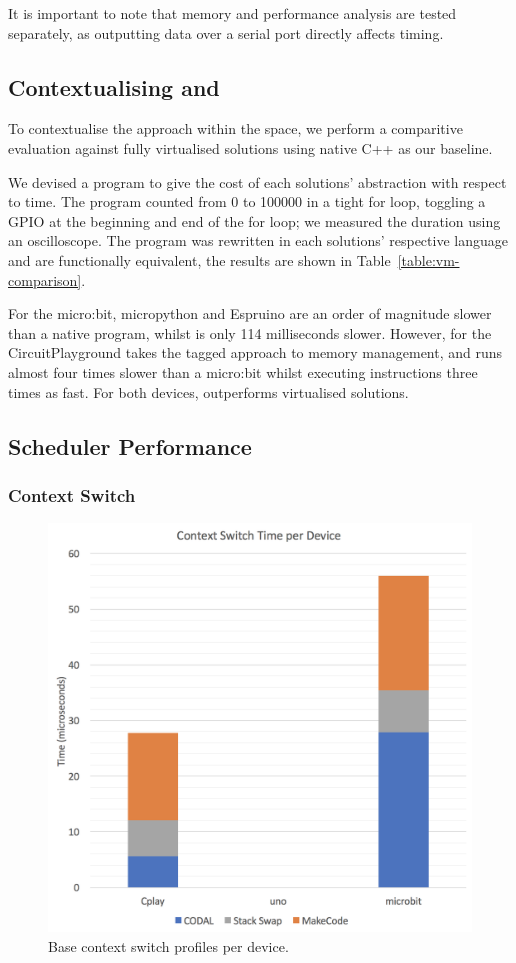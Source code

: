 It is important to note that memory and performance analysis are tested separately, as outputting data over a serial port directly affects timing.

\subsection{Contextualising \MC and \CO}

To contextualise the \MC approach within the space, we perform a comparitive evaluation against fully virtualised solutions using native C++ as our baseline.

We devised a program to give the cost of each solutions' abstraction with respect to time. The program counted from 0 to 100000 in a tight for loop, toggling a GPIO at the beginning and end of the for loop; we measured the duration using an oscilloscope. The program was rewritten in each solutions' respective language and are functionally equivalent, the results are shown in Table~\ref{table:vm-comparison}.

For the micro:bit, micropython and Espruino are an order of magnitude slower than a native \CO program, whilst \MC is only 114 milliseconds slower. However, \MC for the CircuitPlayground takes the tagged approach to memory management, and runs almost four times slower than a micro:bit whilst executing instructions three times as fast. For both devices, \MC outperforms virtualised solutions.

\subsection{Scheduler Performance}

\subsubsection{Context Switch}

\begin{figure}[ht]
    \includegraphics[width=.9\columnwidth]{images/context-switch.png}
\caption{\label{fig:context-switch}Base context switch profiles per device.}
\end{figure}

